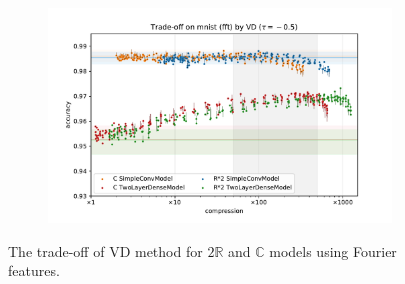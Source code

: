 \documentclass[a4paper,10pt]{article}
\newcommand{\real}{\mathbb{R}}
\newcommand{\cplx}{\mathbb{C}}
\begin{document}
\begin{figure}[b]
\begin{subfigure}[b]{0.5\textwidth}
  \end{subfigure}%
  \begin{subfigure}[b]{0.5\textwidth}
    \centering
    \includegraphics[width=\linewidth]{figure__mnist-like__trade-off/appendix__cmp__VD__mnist__fft__-0.5.pdf}
  \end{subfigure}
  \caption{%
    The trade-off of VD method for $2\real$ and $\cplx$ models using Fourier features.
  }
  \label{fig:appendix__cmp__mnist-like__trade-off__VD__fft}
\end{figure}
\end{document}
